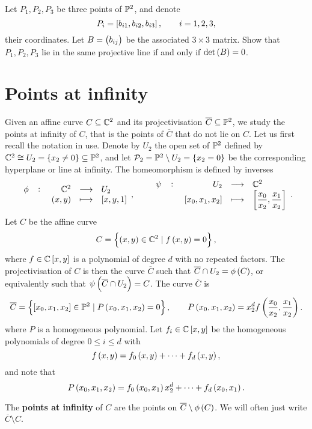 \begin{exercise}
\label{ex:19}
Let $ P_1, P_2, P_3 $ be three points of $ \P^2 $, and denote
$$ P_i = \sbr{b_{i1}, b_{i2}, b_{i3}}, \qquad i = 1, 2, 3, $$
their coordinates. Let $ B = \br{b_{ij}} $ be the associated $ 3 \times 3 $ matrix. Show that $ P_1, P_2, P_3 $ lie in the same projective line if and only if $ \det\br{B} = 0 $.
\end{exercise}

\pagebreak

\section{Points at infinity}

Given an affine curve $ C \subseteq \C^2 $ and its projectivisation $ \overline{C} \subseteq \P^2 $, we study the points at infinity of $ C $, that is the points of $ \overline{C} $ that do not lie on $ C $. Let us first recall the notation in use. Denote by $ U_2 $ the open set of $ \P^2 $ defined by $ \C^2 \cong U_2 = \cbr{x_2 \ne 0} \subseteq \P^2 $, and let $ \PP_2 = \P^2 \setminus U_2 = \cbr{x_2 = 0} $ be the corresponding hyperplane or line at infinity. The homeomorphism is defined by inverses
$$ \function[\phi]{\C^2}{U_2}{\br{x, y}}{\sbr{x, y, 1}}, \qquad \function[\psi]{U_2}{\C^2}{\sbr{x_0, x_1, x_2}}{\sbr{\dfrac{x_0}{x_2}, \dfrac{x_1}{x_2}}}. $$
Let $ C $ be the affine curve
$$ C = \cbr{\br{x, y} \in \C^2 \mid f\br{x, y} = 0}, $$
where $ f \in \C\sbr{x, y} $ is a polynomial of degree $ d $ with no repeated factors. The projectivisation of $ C $ is then the curve $ \overline{C} $ such that $ \overline{C} \cap U_2 = \phi\br{C} $, or equivalently such that $ \psi\br{\overline{C} \cap U_2} = C $. The curve $ \overline{C} $ is
$$ \overline{C} = \cbr{\sbr{x_0, x_1, x_2} \in \P^2 \mid P\br{x_0, x_1, x_2} = 0}, \qquad P\br{x_0, x_1, x_2} = x_2^df\br{\dfrac{x_0}{x_2}, \dfrac{x_1}{x_2}}. $$
where $ P $ is a homogeneous polynomial. Let $ f_i \in \C\sbr{x, y} $ be the homogeneous polynomials of degree $ 0 \le i \le d $ with
$$ f\br{x, y} = f_0\br{x, y} + \dots + f_d\br{x, y}, $$
and note that
\begin{equation}
\label{eq:4}
P\br{x_0, x_1, x_2} = f_0\br{x_0, x_1}x_2^d + \dots + f_d\br{x_0, x_1}.
\end{equation}

\begin{definition}
The \textbf{points at infinity} of $ C $ are the points on $ \overline{C} \setminus \phi\br{C} $. We will often just write $ \overline{C} \setminus C $.
\end{definition}

